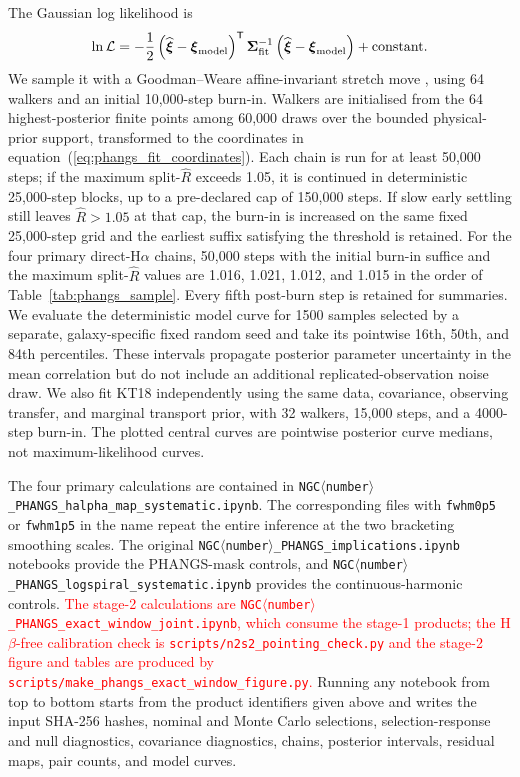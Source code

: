\documentclass[fleqn,usenatbib]{mnras}
\newcommand{\revadd}[1]{\textcolor{red}{#1}}
\begin{document}
The Gaussian log likelihood is
\begin{equation}
    \ln{\cal L}=-\frac{1}{2}
    \left(\widehat{\boldsymbol\xi}-\boldsymbol\xi_{\rm model}\right)^{\mathsf T}
    \boldsymbol\Sigma_{\rm fit}^{-1}
    \left(\widehat{\boldsymbol\xi}-\boldsymbol\xi_{\rm model}\right)
    +\mathrm{constant}.
    \label{eq:phangs_likelihood}
\end{equation}
We sample it with a Goodman--Weare affine-invariant stretch move \citep{Foreman-Mackey13a}, using 64 walkers and an initial 10,000-step burn-in.  Walkers are initialised from the 64 highest-posterior finite points among 60,000 draws over the bounded physical-prior support, transformed to the coordinates in equation~(\ref{eq:phangs_fit_coordinates}).  Each chain is run for at least 50,000 steps; if the maximum split-$\widehat R$ exceeds 1.05, it is continued in deterministic 25,000-step blocks, up to a pre-declared cap of 150,000 steps.  If slow early settling still leaves $\widehat R>1.05$ at that cap, the burn-in is increased on the same fixed 25,000-step grid and the earliest suffix satisfying the threshold is retained.  For the four primary direct-H$\alpha$ chains, 50,000 steps with the initial burn-in suffice and the maximum split-$\widehat R$ values are 1.016, 1.021, 1.012, and 1.015 in the order of Table~\ref{tab:phangs_sample}.  Every fifth post-burn step is retained for summaries.  We evaluate the deterministic model curve for 1500 samples selected by a separate, galaxy-specific fixed random seed and take its pointwise 16th, 50th, and 84th percentiles.  These intervals propagate posterior parameter uncertainty in the mean correlation but do not include an additional replicated-observation noise draw.  We also fit KT18 independently using the same data, covariance, observing transfer, and marginal transport prior, with 32 walkers, 15,000 steps, and a 4000-step burn-in.  The plotted central curves are pointwise posterior curve medians, not maximum-likelihood curves.

The four primary calculations are contained in \texttt{NGC$\langle$number$\rangle$\_PHANGS\_\allowbreak halpha\_map\_\allowbreak systematic.ipynb}.  The corresponding files with \texttt{fwhm0p5} or \texttt{fwhm1p5} in the name repeat the entire inference at the two bracketing smoothing scales.  The original \texttt{NGC$\langle$number$\rangle$\_PHANGS\_\allowbreak implications.ipynb} notebooks provide the PHANGS-mask controls, and \texttt{NGC$\langle$number$\rangle$\_PHANGS\_\allowbreak logspiral\_systematic.ipynb} provides the continuous-harmonic controls.  \revadd{The stage-2 calculations are \texttt{NGC$\langle$number$\rangle$\_PHANGS\_\allowbreak exact\_window\_joint.ipynb}, which consume the stage-1 products; the H$\beta$-free calibration check is \texttt{scripts/n2s2\_pointing\_check.py} and the stage-2 figure and tables are produced by \texttt{scripts/make\_phangs\_exact\_window\_figure.py}.}  Running any notebook from top to bottom starts from the product identifiers given above and writes the input SHA-256 hashes, nominal and Monte Carlo selections, selection-response and null diagnostics, covariance diagnostics, chains, posterior intervals, residual maps, pair counts, and model curves.
\end{document}
